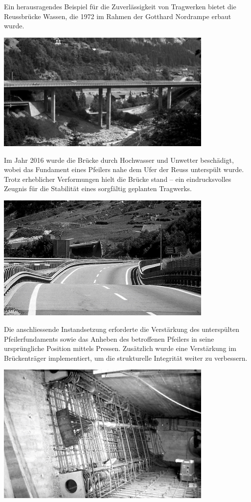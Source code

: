 Ein herausragendes Beispiel für die Zuverlässigkeit von Tragwerken bietet die Reussbrücke Wassen, die 1972 im Rahmen der Gotthard Nordrampe erbaut wurde. 
\begin{center}
	\includegraphics[width=0.8\textwidth]{papers/balken/images/teil3/ReussbrueckeWassen1.jpg}
	\label{Abbildung x: Reussbrücke Wassen}
\end{center}
Im Jahr 2016 wurde die Brücke durch Hochwasser und Unwetter beschädigt, wobei das Fundament eines Pfeilers nahe dem Ufer der Reuss unterspült wurde. 
Trotz erheblicher Verformungen hielt die Brücke stand – ein eindrucksvolles Zeugnis für die Stabilität eines sorgfältig geplanten Tragwerks.
\begin{center}
	\includegraphics[width=0.8\textwidth]{papers/balken/images/teil3/ReussbrueckeWassen2.jpg}
	\label{Abbildung x: Verformungsvermögen}
\end{center}
Die anschliessende Instandsetzung erforderte die Verstärkung des unterspülten Pfeilerfundaments sowie das Anheben des betroffenen Pfeilers in seine ursprüngliche Position mittels Pressen. 
Zusätzlich wurde eine Verstärkung im Brückenträger implementiert, um die strukturelle Integrität weiter zu verbessern. 
\begin{center}
	\includegraphics[width=0.8\textwidth]{papers/balken/images/teil3/ReussbrueckeWassen3.jpg}
	\label{Abbildung x: Verstärkung der Brückentäger}
\end{center}

